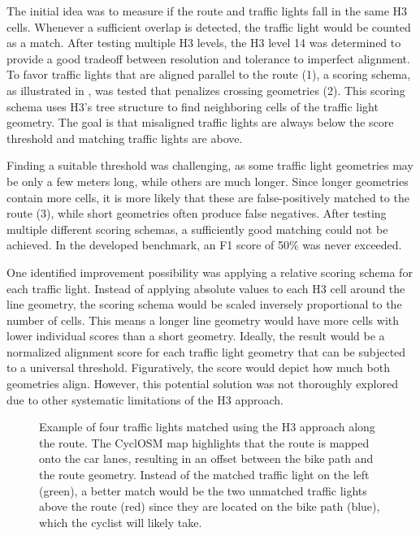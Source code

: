 The initial idea was to measure if the route and traffic lights fall in the same H3 cells. Whenever a sufficient overlap is detected, the traffic light would be counted as a match. After testing multiple H3 levels, the H3 level 14 was determined to provide a good tradeoff between resolution and tolerance to imperfect alignment. To favor traffic lights that are aligned parallel to the route (1), a scoring schema, as illustrated in , was tested that penalizes crossing geometries (2). This scoring schema uses H3's tree structure to find neighboring cells of the traffic light geometry. The goal is that misaligned traffic lights are always below the score threshold and matching traffic lights are above.

Finding a suitable threshold was challenging, as some traffic light geometries may be only a few meters long, while others are much longer. Since longer geometries contain more cells, it is more likely that these are false-positively matched to the route (3), while short geometries often produce false negatives. After testing multiple different scoring schemas, a sufficiently good matching could not be achieved. In the developed benchmark, an F1 score of 50\% was never exceeded. 

One identified improvement possibility was applying a relative scoring schema for each traffic light. Instead of applying absolute values to each H3 cell around the line geometry, the scoring schema would be scaled inversely proportional to the number of cells. This means a longer line geometry would have more cells with lower individual scores than a short geometry. Ideally, the result would be a normalized alignment score for each traffic light geometry that can be subjected to a universal threshold. Figuratively, the score would depict how much both geometries align. However, this potential solution was not thoroughly explored due to other systematic limitations of the H3 approach.

\begin{figure}[t]
\centering
{}
\caption{Example of four traffic lights matched using the H3 approach along the route. The CyclOSM map highlights that the route is mapped onto the car lanes, resulting in an offset between the bike path and the route geometry. Instead of the matched traffic light on the left (green), a better match would be the two unmatched traffic lights above the route (red) since they are located on the bike path (blue), which the cyclist will likely take.}
\label{fig:sg-selection-h3-example}
\end{figure}


